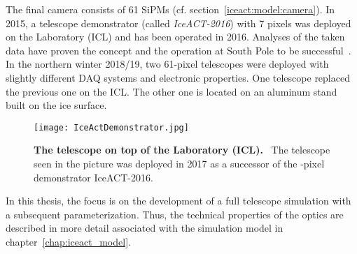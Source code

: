 The final \iceact camera consists of \num{61} SiPMs (cf. section~\ref{iceact:model:camera}). In 2015, a telescope demonstrator (called \textit{IceACT-2016}) with 7 pixels was deployed on the \icecube Laboratory (ICL) and has been operated in 2016. Analyses of the taken data have proven the concept and the operation at South Pole to be successful~\cite{iceact:erik}.\\

In the northern winter 2018/19, two 61-pixel telescopes were deployed with slightly different DAQ systems and electronic properties. One telescope replaced the previous one on the ICL. The other one is located on an aluminum stand built on the ice surface.\\

\begin{figure}[H]
	\centering
	\texttt{[image: IceActDemonstrator.jpg]}
	\caption[The \iceact telescope on top of the \icecube Laboratory (ICL)]{\textbf{The \iceact telescope on top of the \icecube Laboratory (ICL).}~\cite{iceact:picture} The telescope seen in the picture was deployed in 2017 as a successor of the -pixel demonstrator IceACT-2016.}
	\label{iceact:picture}
\end{figure}

In this thesis, the focus is on the development of a full telescope simulation with a subsequent parameterization. Thus, the technical properties of the \iceact optics are described in more detail associated with the simulation model in chapter~\ref{chap:iceact_model}. 
